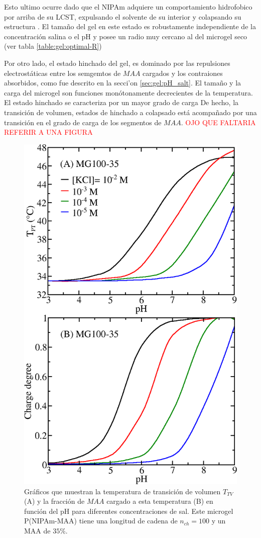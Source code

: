 Esto ultimo ocurre dado que el NIPAm adquiere un comportamiento hidrofobico por arriba de su LCST, expulsando el solvente de su interior y colapsando su estructura \cite{sbeih2019structural}.
El tama\~no del gel en este estado es robustamente independiente de la concentraci\'on salina o el pH y posee un radio muy cercano al del microgel seco (ver tabla \ref{table:gel:optimal-R})



Por otro lado, el estado hinchado del gel, es dominado por las repulsiones electrost\'aticas entre los semgemtos de $MAA$ cargados y los contraiones absorbidos, como fue descrito en la secci'on \ref{sec:gel:pH_salt}.
El tama\~no y la carga del microgel son funciones mon\'otonamente decrecientes de la temperatura.
El estado hinchado se caracteriza por un mayor grado de carga 
De hecho, la transici\'on de volumen, estados de  hinchado a colapsado est\'a acompa\~nado por una transici\'on en el grado de carga de los segmentos de $MAA$.
\textcolor{red}{OJO QUE FALTARIA REFERIR A UNA FIGURA}

\begin{figure}[!htb]
	\centering
	\includegraphics[width=0.5\linewidth]{Figures/graph-gel/Tpt-pH.png}
	\caption{Gr\'aficos que muestran la temperatura de transici\'on de volumen $T_{TV}$ (A) y la fracci\'on de $MAA$ cargado a esta temperatura (B) en funci\'on del pH para diferentes concentraciones de sal.
		Este microgel P(NIPAm-MAA) tiene una longitud de cadena de $n_{ch}=100$ y un MAA de $35\%$.}
	\label{fig:gel:Tpt-pH}
\end{figure}



